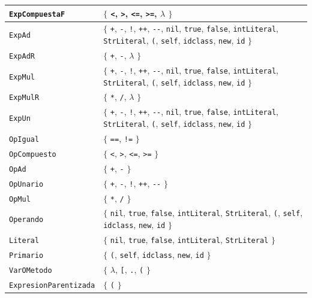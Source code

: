 \begin{longtable}{|
>{\raggedright\arraybackslash}p{}|
>{\raggedright\arraybackslash}p{}|}
\texttt{ExpCompuestaF} & \(\{\) \texttt{<}, \texttt{>}, \texttt{<=}, \texttt{>=}, \(\lambda\) \(\}\) \\ \hline
\texttt{ExpAd} & \(\{\) \texttt{+}, \texttt{-}, \texttt{!}, \texttt{++}, \texttt{-{}-}, \texttt{nil}, \texttt{true}, \texttt{false}, \texttt{intLiteral}, \texttt{StrLiteral}, \texttt{(}, \texttt{self}, \texttt{idclass}, \texttt{new}, \texttt{id} \(\}\) \\ \hline
\texttt{ExpAdR} & \(\{\) \texttt{+}, \texttt{-}, \(\lambda\) \(\}\) \\ \hline
\texttt{ExpMul} & \(\{\) \texttt{+}, \texttt{-}, \texttt{!}, \texttt{++}, \texttt{-{}-}, \texttt{nil}, \texttt{true}, \texttt{false}, \texttt{intLiteral}, \texttt{StrLiteral}, \texttt{(}, \texttt{self}, \texttt{idclass}, \texttt{new}, \texttt{id} \(\}\) \\ \hline
\texttt{ExpMulR} & \(\{\) \texttt{*}, \texttt{/}, \(\lambda\) \(\}\) \\ \hline
\texttt{ExpUn} & \(\{\) \texttt{+}, \texttt{-}, \texttt{!}, \texttt{++}, \texttt{-{}-}, \texttt{nil}, \texttt{true}, \texttt{false}, \texttt{intLiteral}, \texttt{StrLiteral}, \texttt{(}, \texttt{self}, \texttt{idclass}, \texttt{new}, \texttt{id} \(\}\) \\ \hline
\texttt{OpIgual} & \(\{\) \texttt{==}, \texttt{!=} \(\}\) \\ \hline
\texttt{OpCompuesto} & \(\{\) \texttt{<}, \texttt{>}, \texttt{<=}, \texttt{>=} \(\}\) \\ \hline
\texttt{OpAd} & \(\{\) \texttt{+}, \texttt{-} \(\}\) \\ \hline
\texttt{OpUnario} & \(\{\) \texttt{+}, \texttt{-}, \texttt{!}, \texttt{++}, \texttt{-{}-} \(\}\) \\ \hline
\texttt{OpMul} & \(\{\) \texttt{*}, \texttt{/} \(\}\) \\ \hline
\texttt{Operando} & \(\{\) \texttt{nil}, \texttt{true}, \texttt{false}, \texttt{intLiteral}, \texttt{StrLiteral}, \texttt{(}, \texttt{self}, \texttt{idclass}, \texttt{new}, \texttt{id} \(\}\) \\ \hline
\texttt{Literal} & \(\{\) \texttt{nil}, \texttt{true}, \texttt{false}, \texttt{intLiteral}, \texttt{StrLiteral} \(\}\) \\ \hline
\texttt{Primario} & \(\{\) \texttt{(}, \texttt{self}, \texttt{idclass}, \texttt{new}, \texttt{id} \(\}\) \\ \hline
\texttt{VarOMetodo} & \(\{\) \(\lambda\), \texttt{[}, \texttt{.}, \texttt{(} \(\}\) \\ \hline
\texttt{ExpresionParentizada} & \(\{\) \texttt{(} \(\}\) \\ \hline

\end{longtable}
